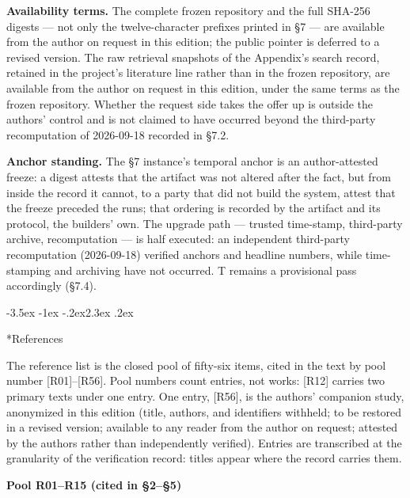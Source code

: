 \documentclass[11pt,a4paper]{article}
\makeatletter
\renewcommand\section{\@startsection{section}{1}{\z@}%
  {-3.5ex \@plus -1ex \@minus -.2ex}{2.3ex \@plus .2ex}%
  {\normalfont\Large\bfseries\raggedright}}
\makeatother
\begin{document}
\textbf{Availability terms.} The complete frozen repository and the full SHA-256 digests — not only the twelve-character prefixes printed in §7 — are available from the author on request in this edition; the public pointer is deferred to a revised version. The raw retrieval snapshots of the Appendix's search record, retained in the project's literature line rather than in the frozen repository, are available from the author on request in this edition, under the same terms as the frozen repository. Whether the request side takes the offer up is outside the authors' control and is not claimed to have occurred beyond the third-party recomputation of 2026-09-18 recorded in §7.2.

\textbf{Anchor standing.} The §7 instance's temporal anchor is an author-attested freeze: a digest attests that the artifact was not altered after the fact, but from inside the record it cannot, to a party that did not build the system, attest that the freeze preceded the runs; that ordering is recorded by the artifact and its protocol, the builders' own. The upgrade path — trusted time-stamp, third-party archive, recomputation — is half executed: an independent third-party recomputation (2026-09-18) verified anchors and headline numbers, while time-stamping and archiving have not occurred. T remains a provisional pass accordingly (§7.4).

\section*{References}

The reference list is the closed pool of fifty-six items, cited in the text by pool number [R01]–[R56]. Pool numbers count entries, not works: [R12] carries two primary texts under one entry. One entry, [R56], is the authors' companion study, anonymized in this edition (title, authors, and identifiers withheld; to be restored in a revised version; available to any reader from the author on request; attested by the authors rather than independently verified). Entries are transcribed at the granularity of the verification record: titles appear where the record carries them.

\medskip
\noindent\textbf{Pool R01–R15 (cited in §2–§5)}\par\addvspace{2pt}
\end{document}
